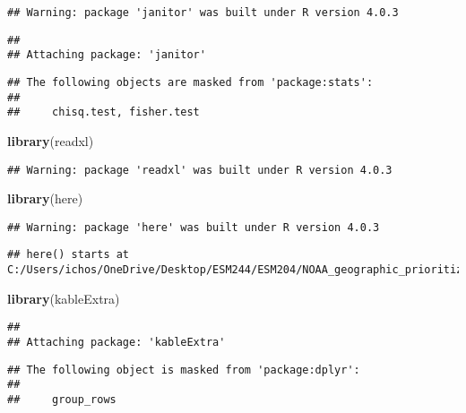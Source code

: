 \documentclass[
]{article}
\newenvironment{Shaded}{\begin{snugshade}}{\end{snugshade}}
\newcommand{\KeywordTok}[1]{\textcolor[rgb]{0.13,0.29,0.53}{\textbf{#1}}}
\newcommand{\NormalTok}[1]{#1}
\begin{document}
\begin{verbatim}
## Warning: package 'janitor' was built under R version 4.0.3
\end{verbatim}

\begin{verbatim}
## 
## Attaching package: 'janitor'
\end{verbatim}

\begin{verbatim}
## The following objects are masked from 'package:stats':
## 
##     chisq.test, fisher.test
\end{verbatim}

\begin{Shaded}
\begin{Highlighting}[]
\KeywordTok{library}\NormalTok{(readxl)}
\end{Highlighting}
\end{Shaded}

\begin{verbatim}
## Warning: package 'readxl' was built under R version 4.0.3
\end{verbatim}

\begin{Shaded}
\begin{Highlighting}[]
\KeywordTok{library}\NormalTok{(here)}
\end{Highlighting}
\end{Shaded}

\begin{verbatim}
## Warning: package 'here' was built under R version 4.0.3
\end{verbatim}

\begin{verbatim}
## here() starts at C:/Users/ichos/OneDrive/Desktop/ESM244/ESM204/NOAA_geographic_prioritization
\end{verbatim}

\begin{Shaded}
\begin{Highlighting}[]
\KeywordTok{library}\NormalTok{(kableExtra)}
\end{Highlighting}
\end{Shaded}

\begin{verbatim}
## 
## Attaching package: 'kableExtra'
\end{verbatim}

\begin{verbatim}
## The following object is masked from 'package:dplyr':
## 
##     group_rows
\end{verbatim}
\end{document}

